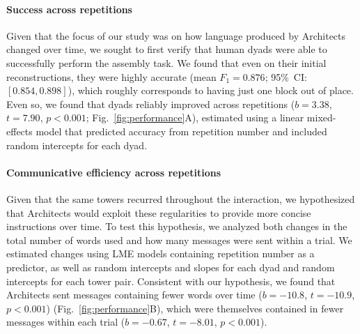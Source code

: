 \documentclass[10pt,letterpaper]{article}
\begin{document}
\paragraph{Success across repetitions}
Given that the focus of our study was on how language produced by Architects changed over time, we sought to first verify that human dyads were able to successfully perform the assembly task. 
We found that even on their initial reconstructions, they were highly accurate (mean $F_1=0.876$; 95\%~CI:$[0.854, 0.898]$), which roughly corresponds to having just one block out of place.
Even so, we found that dyads reliably improved across repetitions ($b=3.38$, $t=7.90$, $p<0.001$; Fig.~\ref{fig:performance}A), estimated using a linear mixed-effects model that predicted accuracy from repetition number and included random intercepts for each dyad.  







\paragraph{Communicative efficiency across repetitions}
Given that the same towers recurred throughout the interaction, we hypothesized that Architects would exploit these regularities to provide more concise instructions over time. 
To test this hypothesis, we analyzed both changes in the total number of words used and how many messages were sent within a trial.
We estimated changes using LME models containing repetition number as a predictor, as well as random intercepts and slopes for each dyad and random intercepts for each tower pair.
Consistent with our hypothesis, we found that Architects sent messages containing fewer words over time ($b=-10.8$, $t=-10.9$, $p<0.001$) (Fig.~\ref{fig:performance}B), which were themselves contained in fewer messages within each trial ($b=-0.67$, $t=-8.01$, $p<0.001$).
\end{document}
